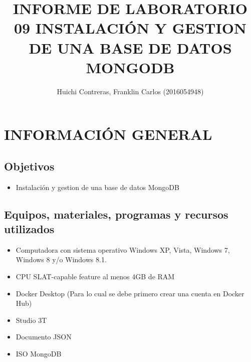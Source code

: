 \documentclass[preprint,12pt]{elsarticle}
\begin{document}
	
	\begin{frontmatter} 

		\title{\huge INFORME DE LABORATORIO 09 INSTALACIÓN Y GESTION DE UNA BASE DE DATOS MONGODB}
		
		\author{Huichi Contreras, Franklin Carlos         	(2016054948)} 
		\address{Escuela Profesional de Ingeniería de Sistemas}
		\address{Universidad Privada de Tacna}
		\address{Tacna, Perú}
		

	\end{frontmatter}


\section{INFORMACIÓN GENERAL} 

\subsection {\textbf{Objetivos}}
\begin{itemize}
	\item Instalación y gestion de una base de datos MongoDB
\end{itemize}

\subsection {\textbf{Equipos, materiales, programas y recursos utilizados}}
\begin{itemize}
	\item Computadora con sistema operativo Windows XP, Vista, Windows 7, Windows 8 y/o Windows 8.1.
	\item CPU SLAT-capable feature al menos 4GB de RAM
	\item Docker Desktop (Para lo cual se debe primero crear una cuenta en Docker Hub)
	\item Studio 3T
	\item Documento JSON
	\item ISO MongoDB
\end{itemize}



\end{document}
